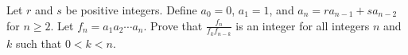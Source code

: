 Let $r$ and $s$ be positive integers. Define $a_0 = 0$, $a_1 = 1$, and $a_n = ra_{n-1} + sa_{n-2}$ for $n \geq 2$. Let $f_n = a_1a_2\cdots a_n$. Prove that $\displaystyle\frac{f_n}{f_kf_{n-k}}$ is an integer for all integers $n$ and $k$ such that $0 < k < n$.